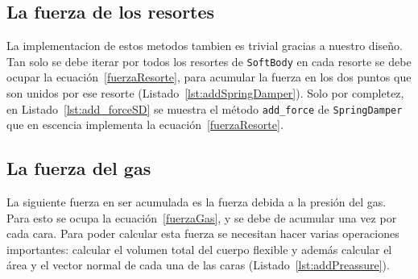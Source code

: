 
\subsection{La fuerza de los resortes}

La implementacion de estos metodos tambien es trivial gracias a nuestro diseño.
Tan solo se debe iterar por todos los resortes de \texttt{SoftBody} en cada resorte se debe ocupar la ecuación~\ref{fuerzaResorte}, para acumular la fuerza en los dos puntos que son unidos por ese resorte (Listado~\ref{lst:addSpringDamper}).
Solo por completez, en Listado~\ref{lst:add_forceSD} se muestra el método \texttt{add_force} de \texttt{SpringDamper} que en escencia implementa la ecuación~\ref{fuerzaResorte}.



\subsection{La fuerza del gas}
\label{sec:fuerzaGas}

La siguiente fuerza en ser acumulada es la fuerza debida a la presión del gas. Para esto se ocupa la ecuación~\ref{fuerzaGas}, y se debe de acumular una vez por cada cara.
Para poder calcular esta fuerza se necesitan hacer varias operaciones importantes: calcular el volumen total del cuerpo flexible y además calcular el área y el vector normal de cada una de las caras (Listado~\ref{lst:addPreassure}).

